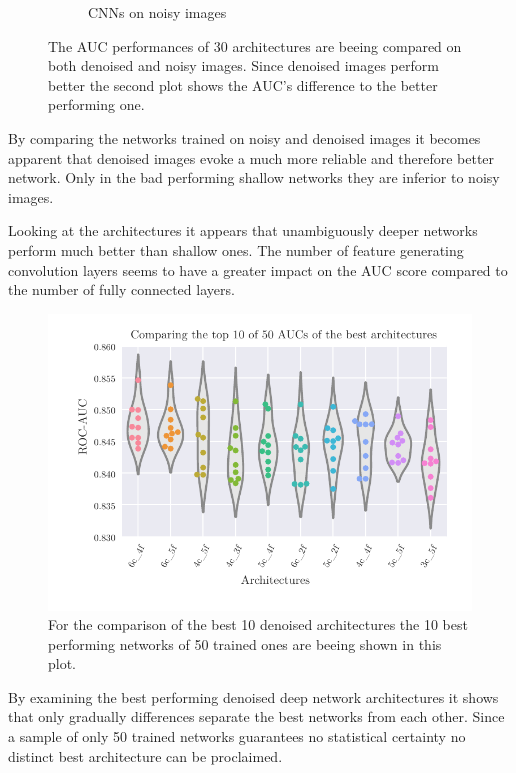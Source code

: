 \begin{figure}
\begin{subfigure}{.5\textwidth}
  \caption{CNNs on noisy images}
  \label{fig:heatmap_noised}
\end{subfigure}
\caption{The AUC performances of \num{30} architectures are beeing compared on both denoised and noisy images. Since denoised images perform better the second plot shows the AUC's difference to the better performing one.}
\label{fig:heatmaps}
\end{figure}

By comparing the networks trained on noisy and denoised images it becomes apparent
that denoised images evoke a much more reliable and therefore better network.
Only in the bad performing shallow networks they are inferior to noisy images.

Looking at the architectures it appears that unambiguously deeper networks perform much better than shallow ones.
The number of feature generating convolution layers seems to have a greater impact on the AUC score
compared to the number of fully connected layers.

\begin{figure}
    \centering
    \includegraphics[scale=1]{Plots/Best_denoised_architectures.pdf}
    \caption{For the comparison of the best \num{10} denoised architectures the \num{10} best performing networks of \num{50} trained ones are beeing shown in this plot.}
    \label{fig:top_cnn_architectures}
\end{figure}

By examining the best performing denoised deep network architectures it shows
that only gradually differences separate the best networks from each other.
Since a sample of only \num{50} trained networks guarantees no statistical certainty
no distinct best architecture can be proclaimed.

